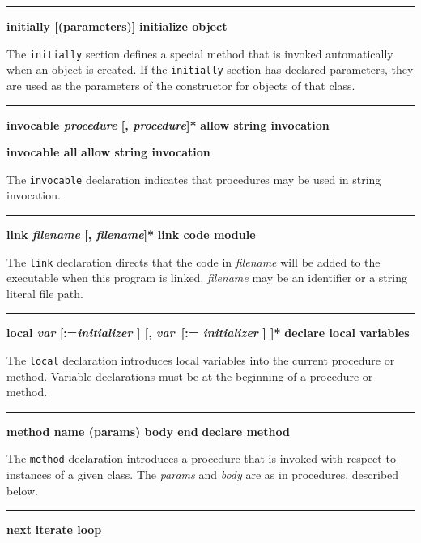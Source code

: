\bigskip\hrule\vspace{0.1cm}
\noindent
{\bf \textbf{initially} [(parameters)] } \hfill {\bf initialize object}

\noindent
{}The \texttt{initially} section defines a special method
that is invoked automatically when an object is created. If the
\texttt{initially} section has declared parameters, they are used as
the parameters of the constructor for objects
of that class.

\bigskip\hrule\vspace{0.1cm}
\noindent
{\bf \textbf{invocable} \textit{procedure} [, \textit{procedure}]* } \hfill {\bf allow string invocation}

\noindent
{}
{\textbf{invocable all} } \hfill {\bf allow string invocation}

\noindent
The \texttt{invocable} declaration indicates that procedures may be used
in string invocation.

\bigskip\hrule\vspace{0.1cm}
\noindent
{\bf \textbf{link} \textit{filename} [, \textit{filename}]* } \hfill {\bf link code module}

\noindent
The \texttt{link} declaration directs that the code in
\textit{filename} will be added to the executable when this program is
linked. \textit{filename} may be an identifier or a string literal file
path.

\bigskip\hrule\vspace{0.1cm}
\noindent
{\bf \textbf{local} \textit{var} [:=\textit{initializer} ] [, \textit{var}\ [:=\textit{ initializer} ] ]* } \hfill {\bf declare local variables}

\noindent
{}The \texttt{local} declaration introduces local
variables into the current procedure or method.
Variable declarations must be at the beginning of a
procedure or method.

\bigskip\hrule\vspace{0.1cm}
\noindent
{\bf method name (params) body end } \hfill {\bf declare method}

\noindent
{}The \texttt{method} declaration introduces a procedure
that is invoked with respect to instances of
a given class. The \textit{params} and \textit{body}
are as in procedures, described below.

\bigskip\hrule\vspace{0.1cm}
\noindent
{\bf next } \hfill {\bf iterate loop}


